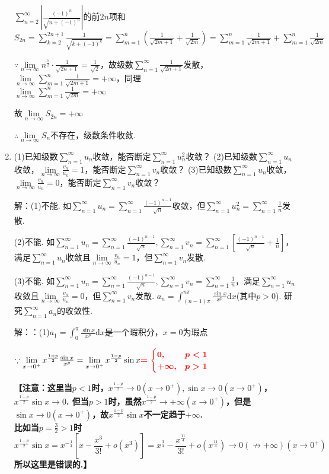\documentclass[12pt,UTF8]{ctexart}
\newcommand\Lim[0]{\lim\limits_{n\rightarrow\infty}}
\newcommand\Ser[1]{\sum_{n=#1}^\infty}
\begin{document}
\begin{enumerate}
$\sum_{n=2}^\infty|\frac{(-1)^n}{\sqrt{n+(-1)^n}}|$的前$2n$项和$S_{2n}=\sum_{k=2}^{2n+1}\frac1{\sqrt{k+(-1)^k}}=\sum_{m=1}^n(\frac1{\sqrt{2m+1}}+\frac1{\sqrt{2m}})=\sum_{m=1}^n\frac1{\sqrt{2m+1}}+\sum_{m=1}^n\frac1{\sqrt{2m}}$

$\because\Lim n^{\frac12}\cdot\frac1{\sqrt{2n+1}}=\frac1{\sqrt2}$，故级数$\sum_{n=1}^\infty\frac1{\sqrt{2n+1}}$发散，$\Lim\sum_{m=1}^n\frac1{\sqrt{2m+1}}=+\infty$，同理\\
$\Lim\sum_{m=1}^n\frac1{\sqrt{2m}}=+\infty$

故$\Lim S_{2n}=+\infty$

$\therefore\Lim S_n$不存在，级数条件收敛.
\item(1)已知级数$\Ser{1}u_n$收敛，能否断定$\Ser{1}u_n^2$收敛？
\newline
(2)已知级数$\Ser{1}u_n$收敛，$\Lim\frac{v_n}{u_n}=1$，能否断定$\Ser{1}v_n$收敛？
\newline
(3)已知级数$\Ser{1}u_n$收敛，$\Lim\frac{v_n}{u_n}=0$，能否断定$\Ser{1}v_n$收敛？

解：(1)不能. 如$\Ser{1}u_n=\Ser{1}\frac{(-1)^{n-1}}{\sqrt n}$收敛，但$\Ser{1}u_n^2=\Ser{1}\frac1n$发散.

(2)不能. 如$\Ser{1}u_n=\Ser{1}\frac{(-1)^{n-1}}{\sqrt n},\Ser{1}v_n=\Ser{1}[\frac{(-1)^{n-1}}{\sqrt n}+\frac1n]$，满足$\Ser{1}u_n$收敛且$\Lim\frac{v_n}{u_n}=1$，但$\Ser{1}v_n$发散.

(3)不能. 如$\Ser{1}u_n=\Ser{1}\frac{(-1)^{n-1}}{\sqrt n},\Ser{1}v_n=\Ser{1}\frac1n$，满足$\Ser{1}u_n$收敛且$\Lim\frac{v_n}{u_n}=0$，但$\Ser{1}v_n$发散.
$a_n=\int_{(n-1)\pi}^{n\pi}\frac{\sin x}{x^p}\mathrm dx$(其中$p>0$). 研究$\sum_{n=1}^\infty a_n$的收敛性.

解：\textcolor{red}{}：(1)$a_1=\int_0^\pi\frac{\sin x}{x^p}\mathrm dx$是一个瑕积分，$x=0$为瑕点

$\because\lim\limits_{x\rightarrow0^+}x^{\frac{1+p}2}\frac{\sin x}{x^p}=\lim\limits_{x\rightarrow0^+}x^{\frac{1-p}2}\sin x\bm{\textcolor{red}{=\begin{cases}
0,&p<1\\
+\infty,&p>1
\end{cases}}}$

{\bf【注意：这里当$p<1$时，$x^{\frac{1-p}2}\rightarrow0(x\rightarrow0^+),\sin x\rightarrow0(x\rightarrow0^+)$，$x^{\frac{1-p}2}\sin x\rightarrow0$. 但当$p>1$时，虽然$x^{\frac{1-p}2}\rightarrow+\infty(x\rightarrow0^+)$，但是$\sin x\rightarrow0(x\rightarrow0^+)$，故$x^{\frac{1-p}2}\sin x$不一定趋于$+\infty$.\\
比如当$p=\frac32>1$时
\[x^{\frac{1-p}2}\sin x=x^{-\frac14}[x-\frac{x^3}{3!}+o(x^3)]=x^{\frac34}-\frac{x^{\frac{11}4}}{3!}+o(x^{\frac{11}4})\rightarrow0(\not\rightarrow+\infty)(x\rightarrow0^+)\]
所以这里是错误的.】}


\end{enumerate}
\end{document}

